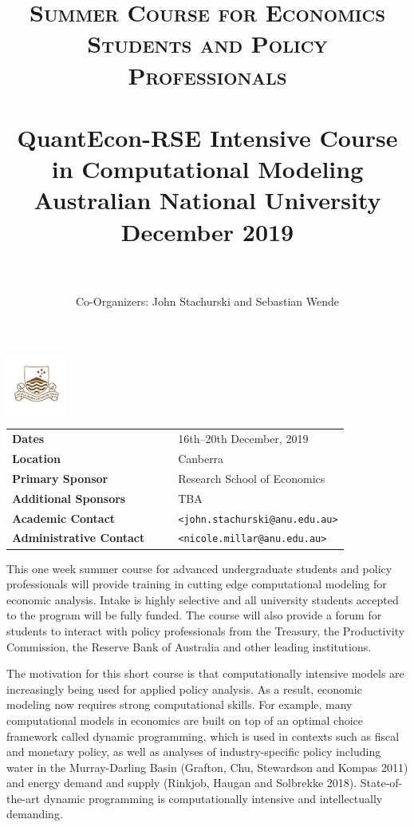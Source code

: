 \documentclass[12pt]{article}
\title{
		\usefont{OT1}{bch}{b}{n}
		\normalfont \normalsize \textsc{Summer Course for Economics Students and Policy Professionals} \\ [25pt]
		\horrule{1pt} \\[0.4cm]
		\huge QuantEcon-RSE Intensive Course in Computational Modeling \\
        \vspace{1em}
		\large Australian National University\\
		\large December 2019\\
		\horrule{1pt} \\[0.5cm]
}
\author{
		\normalfont \normalsize
        Co-Organizers: John Stachurski and Sebastian Wende \\[-3pt]		\normalsize
}
\date{}
\numberwithin{equation}{section}		%
\numberwithin{table}{section}				%
\begin{document}
\maketitle




\begin{center}
    \vspace{-2em}
    \includegraphics[width=2cm]{anu-logo-2.png}
    \vspace{1em}

    \begin{tabular}{ l  r r l}
        \textbf{Dates} & & &  16th--20th December, 2019\\
        \textbf{Location} & & &  Canberra \\
        \textbf{Primary Sponsor} & & &  Research School of Economics \\
        \textbf{Additional Sponsors} & & &  TBA \\
        \textbf{Academic Contact} & & & \texttt{<john.stachurski@anu.edu.au>} \\
        \textbf{Administrative Contact} & & & \texttt{<nicole.millar@anu.edu.au>} \\
    \end{tabular}
\end{center}

\bigskip
\bigskip

\noindent 
This one week summer course for advanced undergraduate students and policy
professionals will provide training in cutting edge computational modeling for
economic analysis.  Intake is highly selective and all university students
accepted to the program will be fully funded.  The course will also provide a
forum for students to interact with policy professionals from the Treasury,
the Productivity Commission, the Reserve Bank of Australia and other leading
institutions.

The motivation for this short course is that computationally
intensive models are increasingly being used for applied policy analysis.
As a result, economic modeling now requires strong computational skills.  For example, many
computational models in economics are built on top of an optimal choice
framework called dynamic programming, which is used in contexts such as fiscal
and monetary policy, as well as analyses of industry-specific policy including
water in the Murray-Darling Basin (Grafton, Chu, Stewardson and Kompas 2011)
and energy demand and supply (Rinkjob, Haugan and Solbrekke
2018).  State-of-the-art dynamic programming is computationally intensive and
     intellectually demanding.
\end{document}
